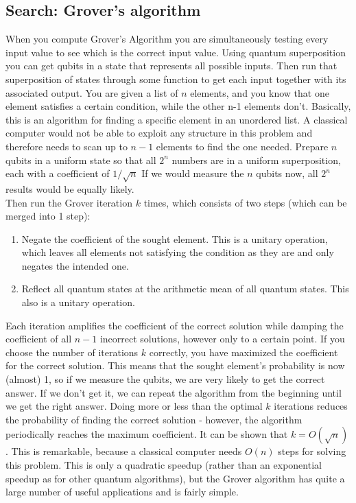 \subsection{Search: Grover's algorithm}
When you compute Grover's Algorithm\cite{grover} you are simultaneously testing every input value to see which is the correct input value. Using quantum superposition you can get qubits in a state that represents all possible inputs. Then run that superposition of states through some function to get each input together with its associated output. You are given a list of $n$ elements, and you know that one element satisfies a certain condition, while the other n-1 elements don't. Basically, this is an algorithm for finding a specific element in an unordered list. A classical computer would not be able to exploit any structure in this problem and therefore needs to scan up to $n-1$ elements to find the one needed.
Prepare $n$ qubits in a uniform state so that all $2^n$ numbers are in a uniform superposition, each with a coefficient of $1/\sqrt{n}$ If we would measure the $n$ qubits now, all $2^n$ results would be equally likely.\\
Then run the Grover iteration $k$ times, which consists of two steps (which can be merged into 1 step):
\begin{enumerate}
\item Negate the coefficient of the sought element. This is a unitary operation, which leaves all elements not satisfying the condition as they are and only negates the intended one.
\item Reflect all quantum states at the arithmetic mean of all quantum states. This also is a unitary operation.
\end{enumerate}
Each iteration amplifies the coefficient of the correct solution while damping the coefficient of all $n-1$ incorrect solutions, however only to a certain point.
If you choose the number of iterations $k$ correctly, you have maximized the coefficient for the correct solution. This means that the sought element's probability is now (almost) 1, so if we measure the qubits, we are very likely to get the correct answer. If we don't get it, we can repeat the algorithm from the beginning until we get the right answer. Doing more or less than the optimal $k$ iterations reduces the probability of finding the correct solution - however, the algorithm periodically reaches the maximum coefficient.
It can be shown that $k=O(\sqrt{n})$. This is remarkable, because a classical computer needs $O(n)$ steps for solving this problem. This is only a quadratic speedup (rather than an exponential speedup as for other quantum algorithms), but the Grover algorithm has quite a large number of useful applications and is fairly simple.
